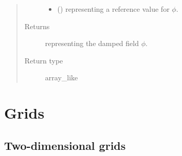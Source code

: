 \documentclass[letterpaper,10pt,english]{sphinxmanual}
\begin{document}
\begin{fulllineitems}
\begin{fulllineitems}
\begin{quote}
\begin{description}
\begin{itemize}
\item {} 
 () \textendash{}  representing a reference value for \(\phi\).

\end{itemize}

\item[{Returns}] \leavevmode
{} representing the damped field \(\phi\).

\item[{Return type}] \leavevmode
array\_like

\end{description}\end{quote}

\end{fulllineitems}


\end{fulllineitems}



\section{Grids}
\label{\detokenize{api:grids}}

\subsection{Two-dimensional grids}
\label{\detokenize{api:two-dimensional-grids}}
\end{document}
